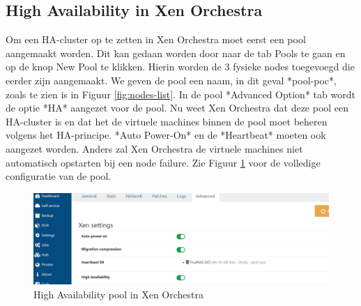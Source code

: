 \subsection{High Availability in Xen Orchestra}
\label{sec:ha-orch}
Om een HA-cluster op te zetten in Xen Orchestra moet eerst een pool aangemaakt worden.
Dit kan gedaan worden door naar de tab Pools te gaan en op de knop New Pool te klikken.
Hierin worden de 3 fysieke nodes toegevoegd die eerder zijn aangemaakt. We geven de pool een naam, in dit geval *pool-poc*, zoals te zien is in Figuur \ref{fig:nodes-list}.  
In de pool *Advanced Option* tab wordt de optie *HA* aangezet voor de pool. Nu weet Xen Orchestra dat deze pool een HA-cluster is en dat het de virtuele machines binnen de pool moet beheren volgens het HA-principe.  
*Auto Power-On* en de *Heartbeat* moeten ook aangezet worden. Anders zal Xen Orchestra de virtuele machines niet automatisch opstarten bij een node failure.  
Zie Figuur \ref{fig:ha-settings-orch.png} voor de volledige configuratie van de pool.

\begin{figure}[H]
  \centering
  \includegraphics[width=1.1\textwidth, trim=0cm 0cm 10cm 0cm, clip]{../poc/ha-settings-orch.png}
  \caption{High Availability pool in Xen Orchestra}
  \label{fig:ha-settings-orch.png}
\end{figure}
